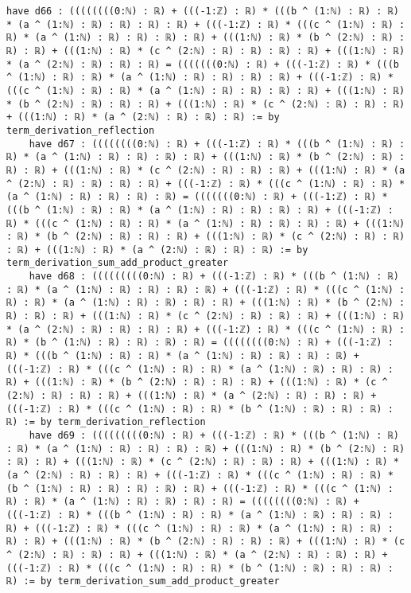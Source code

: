 \documentclass{article}
\begin{document}
\begin{tcolorbox}[colback=white!10, width=\linewidth]
\begin{lstlisting}[language=Lean4]
    have d66 : ((((((((0:ℕ) : ℝ) + (((-1:ℤ) : ℝ) * (((b ^ (1:ℕ) : ℝ) : ℝ) * (a ^ (1:ℕ) : ℝ) : ℝ) : ℝ) : ℝ) + (((-1:ℤ) : ℝ) * (((c ^ (1:ℕ) : ℝ) : ℝ) * (a ^ (1:ℕ) : ℝ) : ℝ) : ℝ) : ℝ) + (((1:ℕ) : ℝ) * (b ^ (2:ℕ) : ℝ) : ℝ) : ℝ) + (((1:ℕ) : ℝ) * (c ^ (2:ℕ) : ℝ) : ℝ) : ℝ) : ℝ) + (((1:ℕ) : ℝ) * (a ^ (2:ℕ) : ℝ) : ℝ) : ℝ) = (((((((0:ℕ) : ℝ) + (((-1:ℤ) : ℝ) * (((b ^ (1:ℕ) : ℝ) : ℝ) * (a ^ (1:ℕ) : ℝ) : ℝ) : ℝ) : ℝ) + (((-1:ℤ) : ℝ) * (((c ^ (1:ℕ) : ℝ) : ℝ) * (a ^ (1:ℕ) : ℝ) : ℝ) : ℝ) : ℝ) + (((1:ℕ) : ℝ) * (b ^ (2:ℕ) : ℝ) : ℝ) : ℝ) + (((1:ℕ) : ℝ) * (c ^ (2:ℕ) : ℝ) : ℝ) : ℝ) + (((1:ℕ) : ℝ) * (a ^ (2:ℕ) : ℝ) : ℝ) : ℝ) := by term_derivation_reflection
    have d67 : ((((((((0:ℕ) : ℝ) + (((-1:ℤ) : ℝ) * (((b ^ (1:ℕ) : ℝ) : ℝ) * (a ^ (1:ℕ) : ℝ) : ℝ) : ℝ) : ℝ) + (((1:ℕ) : ℝ) * (b ^ (2:ℕ) : ℝ) : ℝ) : ℝ) + (((1:ℕ) : ℝ) * (c ^ (2:ℕ) : ℝ) : ℝ) : ℝ) + (((1:ℕ) : ℝ) * (a ^ (2:ℕ) : ℝ) : ℝ) : ℝ) : ℝ) + (((-1:ℤ) : ℝ) * (((c ^ (1:ℕ) : ℝ) : ℝ) * (a ^ (1:ℕ) : ℝ) : ℝ) : ℝ) : ℝ) = (((((((0:ℕ) : ℝ) + (((-1:ℤ) : ℝ) * (((b ^ (1:ℕ) : ℝ) : ℝ) * (a ^ (1:ℕ) : ℝ) : ℝ) : ℝ) : ℝ) + (((-1:ℤ) : ℝ) * (((c ^ (1:ℕ) : ℝ) : ℝ) * (a ^ (1:ℕ) : ℝ) : ℝ) : ℝ) : ℝ) + (((1:ℕ) : ℝ) * (b ^ (2:ℕ) : ℝ) : ℝ) : ℝ) + (((1:ℕ) : ℝ) * (c ^ (2:ℕ) : ℝ) : ℝ) : ℝ) + (((1:ℕ) : ℝ) * (a ^ (2:ℕ) : ℝ) : ℝ) : ℝ) := by term_derivation_sum_add_product_greater
    have d68 : (((((((((0:ℕ) : ℝ) + (((-1:ℤ) : ℝ) * (((b ^ (1:ℕ) : ℝ) : ℝ) * (a ^ (1:ℕ) : ℝ) : ℝ) : ℝ) : ℝ) + (((-1:ℤ) : ℝ) * (((c ^ (1:ℕ) : ℝ) : ℝ) * (a ^ (1:ℕ) : ℝ) : ℝ) : ℝ) : ℝ) + (((1:ℕ) : ℝ) * (b ^ (2:ℕ) : ℝ) : ℝ) : ℝ) + (((1:ℕ) : ℝ) * (c ^ (2:ℕ) : ℝ) : ℝ) : ℝ) + (((1:ℕ) : ℝ) * (a ^ (2:ℕ) : ℝ) : ℝ) : ℝ) : ℝ) + (((-1:ℤ) : ℝ) * (((c ^ (1:ℕ) : ℝ) : ℝ) * (b ^ (1:ℕ) : ℝ) : ℝ) : ℝ) : ℝ) = ((((((((0:ℕ) : ℝ) + (((-1:ℤ) : ℝ) * (((b ^ (1:ℕ) : ℝ) : ℝ) * (a ^ (1:ℕ) : ℝ) : ℝ) : ℝ) : ℝ) + (((-1:ℤ) : ℝ) * (((c ^ (1:ℕ) : ℝ) : ℝ) * (a ^ (1:ℕ) : ℝ) : ℝ) : ℝ) : ℝ) + (((1:ℕ) : ℝ) * (b ^ (2:ℕ) : ℝ) : ℝ) : ℝ) + (((1:ℕ) : ℝ) * (c ^ (2:ℕ) : ℝ) : ℝ) : ℝ) + (((1:ℕ) : ℝ) * (a ^ (2:ℕ) : ℝ) : ℝ) : ℝ) + (((-1:ℤ) : ℝ) * (((c ^ (1:ℕ) : ℝ) : ℝ) * (b ^ (1:ℕ) : ℝ) : ℝ) : ℝ) : ℝ) := by term_derivation_reflection
    have d69 : (((((((((0:ℕ) : ℝ) + (((-1:ℤ) : ℝ) * (((b ^ (1:ℕ) : ℝ) : ℝ) * (a ^ (1:ℕ) : ℝ) : ℝ) : ℝ) : ℝ) + (((1:ℕ) : ℝ) * (b ^ (2:ℕ) : ℝ) : ℝ) : ℝ) + (((1:ℕ) : ℝ) * (c ^ (2:ℕ) : ℝ) : ℝ) : ℝ) + (((1:ℕ) : ℝ) * (a ^ (2:ℕ) : ℝ) : ℝ) : ℝ) + (((-1:ℤ) : ℝ) * (((c ^ (1:ℕ) : ℝ) : ℝ) * (b ^ (1:ℕ) : ℝ) : ℝ) : ℝ) : ℝ) : ℝ) + (((-1:ℤ) : ℝ) * (((c ^ (1:ℕ) : ℝ) : ℝ) * (a ^ (1:ℕ) : ℝ) : ℝ) : ℝ) : ℝ) = ((((((((0:ℕ) : ℝ) + (((-1:ℤ) : ℝ) * (((b ^ (1:ℕ) : ℝ) : ℝ) * (a ^ (1:ℕ) : ℝ) : ℝ) : ℝ) : ℝ) + (((-1:ℤ) : ℝ) * (((c ^ (1:ℕ) : ℝ) : ℝ) * (a ^ (1:ℕ) : ℝ) : ℝ) : ℝ) : ℝ) + (((1:ℕ) : ℝ) * (b ^ (2:ℕ) : ℝ) : ℝ) : ℝ) + (((1:ℕ) : ℝ) * (c ^ (2:ℕ) : ℝ) : ℝ) : ℝ) + (((1:ℕ) : ℝ) * (a ^ (2:ℕ) : ℝ) : ℝ) : ℝ) + (((-1:ℤ) : ℝ) * (((c ^ (1:ℕ) : ℝ) : ℝ) * (b ^ (1:ℕ) : ℝ) : ℝ) : ℝ) : ℝ) := by term_derivation_sum_add_product_greater

\end{lstlisting}
\end{tcolorbox}
\end{document}
